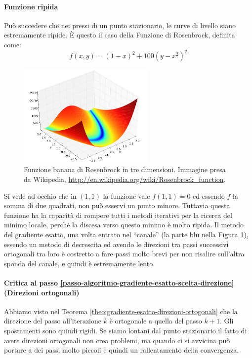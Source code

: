 \paragraph{Funzione ripida} Può succedere che nei pressi di un punto
stazionario, le curve di livello siano estremamente ripide. \`E questo
il caso della Funzione di Rosenbrock, definita come:
\begin{equation}
\label{eq:rosenbrok-banana} f(x,y) = (1-x)^2 + 100(y-x^2)^2
\end{equation}

\begin{figure}[h!]   \centering
    \includegraphics[width=0.60\textwidth]{imgs/rosenbrock-banana.png}
  \caption{Funzione banana di Rosenbrock in tre dimensioni. Immagine
presa da Wikipedia,
\url{http://en.wikipedia.org/wiki/Rosenbrock_function}.}\label{img:rosenbrock-banana}
\end{figure}


Si vede ad occhio che in $(1,1)$ la funzione vale $f(1,1) = 0$ ed
essendo $f$ la somma di due quadrati, non può esservi un punto
minore. Tuttavia questa funzione ha la capacit\`a di rompere tutti i
metodi iterativi per la ricerca del minimo locale, perch\'e la discesa
verso questo minimo \`e molto ripida. Il metodo del gradiente esatto,
una volta entrato nel ``canale'' (la parte blu nella Figura \ref{img:rosenbrock-banana}), essendo
un metodo di decrescita ed avendo le direzioni tra passi successivi
ortogonali tra loro \`e costretto a fare passi molto brevi per non
risalire sull'altra sponda del canale, e quindi \`e estremamente lento.

\paragraph{Critica al passo
\ref{passo-algoritmo-gradiente-esatto-scelta-direzione} (Direzioni
ortogonali)} Abbiamo visto nel Teorema
\ref{theo:gradiente-esatto-direzioni-ortogonali} che la direzione del
passo all'iterazione $k$ \`e ortogonale a quella del passo $k+1$. Gli
spostamenti sono quindi rigidi. Se siamo lontani dal punto stazionario
il fatto di avere direzioni ortogonali non crea problemi, ma quando ci
si avvicina può portare a dei passi molto piccoli e quindi un
rallentamento della convergenza.

